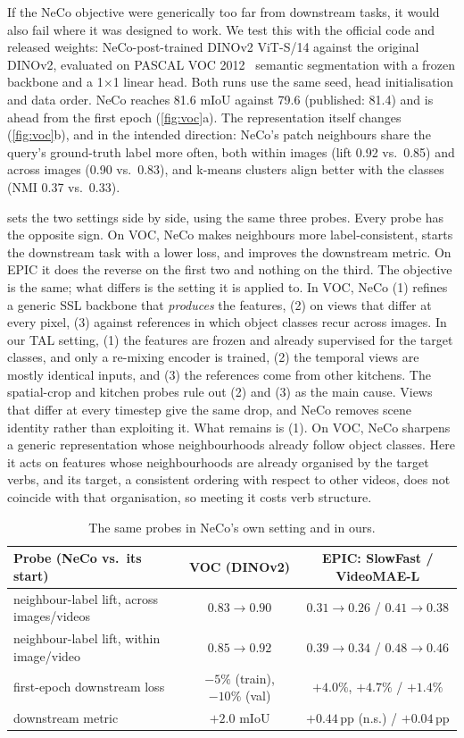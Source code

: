 \documentclass[10pt,a4paper]{article}
\newcommand{\pp}{\,pp}
\begin{document}
If the NeCo objective were generically too far from downstream tasks, it would also fail
where it was designed to work. We test this with the official code and released weights:
NeCo-post-trained DINOv2 ViT-S/14 against the original DINOv2, evaluated on PASCAL VOC
2012~\cite{everingham2010voc} semantic segmentation with a frozen backbone and a
1$\times$1 linear head. Both runs use the same seed, head initialisation and data order.
NeCo reaches 81.6 mIoU against 79.6 (published: 81.4) and is ahead from the first epoch
(\cref{fig:voc}a). The representation itself changes (\cref{fig:voc}b), and in the
intended direction: NeCo's patch neighbours share the query's ground-truth label more
often, both within images (lift 0.92 vs.\ 0.85) and across images (0.90 vs.\ 0.83), and
k-means clusters align better with the classes (NMI 0.37 vs.\ 0.33).

 sets the two settings side by side, using the same three probes. Every
probe has the opposite sign. On VOC, NeCo makes neighbours more label-consistent, starts
the downstream task with a lower loss, and improves the downstream metric. On EPIC it does
the reverse on the first two and nothing on the third. The objective is the same; what
differs is the setting it is applied to. In VOC, NeCo (1) refines a generic SSL backbone
that \emph{produces} the features, (2) on views that differ at every pixel, (3) against
references in which object classes recur across images. In our TAL setting, (1) the
features are frozen and already supervised for the target classes, and only a re-mixing
encoder is trained, (2) the temporal views are mostly identical inputs, and (3) the
references come from other kitchens. The spatial-crop and kitchen probes rule out (2)
and (3) as the main cause. Views that differ at every timestep give the same drop, and
NeCo removes scene identity rather than exploiting it. What remains is (1). On VOC, NeCo
sharpens a generic representation whose neighbourhoods already follow object classes.
Here it acts on features whose neighbourhoods are already organised by the target
verbs, and its target, a consistent ordering with respect to other videos, does not
coincide with that organisation, so meeting it costs verb structure.

\begin{table}[t]
\centering\small
\caption{The same probes in NeCo's own setting and in ours.}
\label{tab:contrast}
\begin{tabular}{lcc}
\toprule
Probe (NeCo vs.\ its start) & VOC (DINOv2) & EPIC: SlowFast / VideoMAE-L \\
\midrule
neighbour-label lift, across images/videos & $0.83\rightarrow0.90$ & $0.31\rightarrow0.26$ / $0.41\rightarrow0.38$ \\
neighbour-label lift, within image/video & $0.85\rightarrow0.92$ & $0.39\rightarrow0.34$ / $0.48\rightarrow0.46$ \\
first-epoch downstream loss & $-5\%$ (train), $-10\%$ (val) & $+4.0\%$, $+4.7\%$ / $+1.4\%$ \\
downstream metric & $+2.0$ mIoU & $+0.44$\pp{} (n.s.) / $+0.04$\pp{} \\
\bottomrule
\end{tabular}
\end{table}
\end{document}
